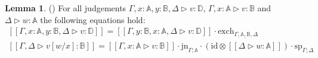 \documentclass[10pt,a4paper]{amsart}
\theoremstyle{definition}
\theoremstyle{definition}
\theoremstyle{definition}
\newtheorem{lemma}[definition]{Lemma}
\theoremstyle{definition}
\theoremstyle{definition}
\theoremstyle{definition}
\begin{document}
\begin{lemma} \label{lem_interpret_exch:sub} () For all judgements $\Gamma,x:\mathbb{A}, y:\mathbb{B}, \Delta \triangleright v: \mathbb{D}$, $\Gamma,x:\mathbb{A} \triangleright v: \mathbb{B}$ and $\Delta \triangleright w: \mathbb{A}$  the following equations hold: 
  \begin{equation*}
\begin{split}
  [\![\Gamma,x:\mathbb{A}, y:\mathbb{B}, \Delta \triangleright v: \mathbb{D}]\!] = [\![\Gamma,y:\mathbb{B},x:\mathbb{A},  \Delta \triangleright v: \mathbb{D}]\! ] \cdot \text{exch}_{\Gamma, \underline{ \mathbb{A}, \mathbb{B}} ,\Delta} \\
  [\![\Gamma, \Delta \triangleright v[w/x]: \mathbb{B}]\!] = [\![\Gamma, x:\mathbb{A} \triangleright v: \mathbb{B}]\!]\cdot \text{jn}_{\Gamma;\mathbb{A}} \cdot (\text{id} \otimes [\![ \Delta  \triangleright w: \mathbb{A}]\!] ) \cdot \text{sp}_{\Gamma;\Delta} 
\end{split}
  \end{equation*}
\end{lemma}
\end{document}
